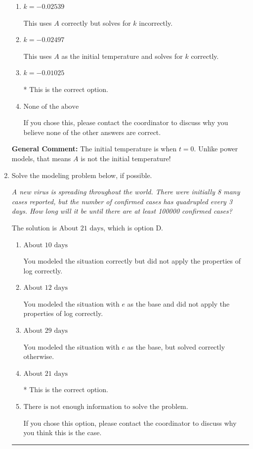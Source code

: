 \documentclass{extbook}[14pt]
\newcommand{\litem}[1]{\item #1

\rule{\textwidth}{0.4pt}}
\begin{document}
\begin{enumerate}
{\begin{enumerate}[label=\Alph*.]
This uses $A$ as the initial temperature and solves for $k$ incorrectly.
\item \( k = -0.02539 \)

This uses $A$ correctly but solves for $k$ incorrectly.
\item \( k = -0.02497 \)

This uses $A$ as the initial temperature and solves for $k$ correctly.
\item \( k = -0.01025 \)

* This is the correct option.
\item \( \text{None of the above} \)

If you chose this, please contact the coordinator to discuss why you believe none of the other answers are correct.
\end{enumerate}

\textbf{General Comment:} The initial temperature is when $t = 0$. Unlike power models, that means $A$ is not the initial temperature!
}
\litem{
Solve the modeling problem below, if possible.

\begin{center}
    \textit{ A new virus is spreading throughout the world. There were initially 8 many cases reported, but the number of confirmed cases has quadrupled every 3 days. How long will it be until there are at least 100000 confirmed cases? }
\end{center}


The solution is \( \text{About } 21 \text{ days} \), which is option D.\begin{enumerate}[label=\Alph*.]
\item \( \text{About } 10 \text{ days} \)

You modeled the situation correctly but did not apply the properties of log correctly.
\item \( \text{About } 12 \text{ days} \)

You modeled the situation with $e$ as the base and did not apply the properties of log correctly.
\item \( \text{About } 29 \text{ days} \)

You modeled the situation with $e$ as the base, but solved correctly otherwise.
\item \( \text{About } 21 \text{ days} \)

* This is the correct option.
\item \( \text{There is not enough information to solve the problem.} \)

If you chose this option, please contact the coordinator to discuss why you think this is the case.
\end{enumerate}

}
\end{enumerate}
\end{document}
